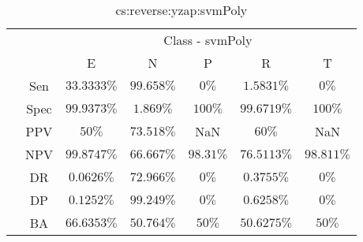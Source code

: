 \begin{table}[!ht]
	\centering
	\begin{tabular}{|c|c|c|c|c|c|c|}
		\cline{3-7}
		\multicolumn{2}{c|}{} & \multicolumn{5}{c|}{Class - svmPoly} \\ \cline{3-7}
		\multicolumn{2}{c|}{} & E & N & P & R & T \\ \hline
		\multirow{7}{*}{\rotatebox{90}{Statistics}} & Sen & $33.3333\%$ & $99.658\%$ & $0\%$ & $1.5831\%$ & $0\%$ \\ \cline{2-7}
		 & Spec & $99.9373\%$ & $1.869\%$ & $100\%$ & $99.6719\%$ & $100\%$ \\ \cline{2-7}
		 & PPV & $50\%$ & $73.518\%$ & NaN & $60\%$ & NaN \\ \cline{2-7}
		 & NPV & $99.8747\%$ & $66.667\%$ & $98.31\%$ & $76.5113\%$ & $98.811\%$ \\ \cline{2-7}
		 & DR & $0.0626\%$ & $72.966\%$ & $0\%$ & $0.3755\%$ & $0\%$ \\ \cline{2-7}
		 & DP & $0.1252\%$ & $99.249\%$ & $0\%$ & $0.6258\%$ & $0\%$ \\ \cline{2-7}
		 & BA & $66.6353\%$ & $50.764\%$ & $50\%$ & $50.6275\%$ & $50\%$ \\ \hline
	\end{tabular}
	\caption{cs:reverse:yzap:svmPoly}
	\label{tab:cs:reverse:yzap:svmPoly}
\end{table}
